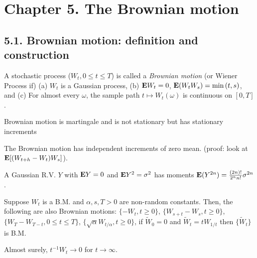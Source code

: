 \section*{Chapter 5. The Brownian motion}
\subsection*{5.1. Brownian motion: definition and construction}

\begin{definition*}
A stochastic process ($W_t, 0 \leq t \leq T$) is called a \emph{Brownian motion} (or Wiener Process if) (a) $W_t$ is a Gaussian process, (b) $\mathbf{E} W_t = 0$, $\mathbf{E}(W_tW_s)= \min{(t,s)}$, and (c) For almost every $\omega$, the sample path $t \mapsto W_t(\omega)$ is continuous on $[0,T]$.
\end{definition*}

\begin{remark*}
Brownian motion is martingale and is not stationary but has stationary increments
\end{remark*}

\begin{proposition*}
The Brownian motion has independent increments of zero mean. (proof: look at $\mathbf{E}[(W_{t+h}-W_t)W_s]$).
\end{proposition*}


\begin{remark*}
A Gaussian R.V. $Y$ with $\mathbf{E} Y=0$ and $\mathbf{E} Y^2 = \sigma^2$ has moments $\mathbf{E}(Y^{2n})=\frac{(2n)!}{2^n n!}\sigma^{2n}$.
\end{remark*}

\begin{exercise*}
Suppose $W_t$ is a B.M. and $\alpha,s,T>0$ are non-random constants. Then, the following are also Brownian motions: $\{-W_t, t\geq0\}$, $\{W_{s+t} - W_s,t\geq0\}$, $\{W_T - W_{T-t},0\leq t\leq T\}$, $\{\sqrt\alpha W_{t/\alpha}, t\geq0\}$, if $\tilde W_0=0$ and $\tilde W_t=tW_{1/t}$ then $\{\tilde W_t\}$ is B.M.
\end{exercise*}

\begin{exercise*}
Almost surely, $t^{-1}W_t\to0$ for $t\to\infty$.
\end{exercise*}


